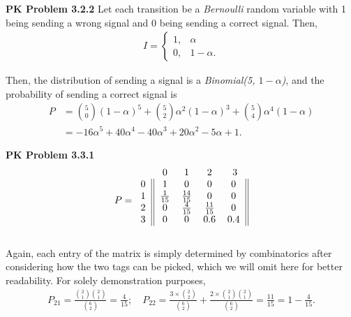 \documentclass{article}
\begin{document}
\textbf{PK Problem 3.2.2}
Let each transition be a \emph{Bernoulli} random variable with 1 being sending a wrong signal and 0 being sending a correct signal. 
Then,
\begin{align}
    I = \begin{cases}
        1, & \alpha \\
        0, & 1-\alpha.
    \end{cases} \nonumber
\end{align}

Then, the distribution of sending a signal is a \emph{Binomial(5, $1-\alpha$)}, and the probability of sending a correct signal is 
\begin{align}
    P & = {5\choose 0} (1-\alpha)^5 + {5\choose 2} \alpha^2(1-\alpha)^3 + {5\choose 4} \alpha^4(1-\alpha) \nonumber \\
    & = -16\alpha^5 + 40\alpha^4 - 40\alpha^3 + 20\alpha^2 - 5\alpha + 1. \nonumber
\end{align}
\bigbreak


\textbf{PK Problem 3.3.1}
\begin{align}
    P = 
    \begin{blockarray}{ccccc}
        & 0 & 1 & 2 & 3  \\
        \begin{block}{c||cccc||}
          0 & 1 & 0 & 0 & 0  \\
          1 & \frac{1}{15} & \frac{14}{15} & 0 & 0  \\
          2 & 0 & \frac{4}{15} & \frac{11}{15} & 0  \\
          3 & 0 & 0 & 0.6 & 0.4 \\
        \end{block}
    \end{blockarray} \nonumber
\end{align}

Again, each entry of the matrix is simply determined by combinatorics after considering how the two tags can be picked, which we will omit here for better readability.
For solely demonstration purposes,
\begin{align}
    P_{21} = \frac{{2\choose 1}{2\choose 1}}{{6\choose 2}} = \frac{4}{15};\quad P_{22} = \frac{3\times {2\choose 2}}{{6\choose 2}} + \frac{2\times {2\choose 1}{2\choose 1}}{{6\choose 2}}= \frac{11}{15} = 1-\frac{4}{15}. \nonumber
\end{align}
\end{document}
